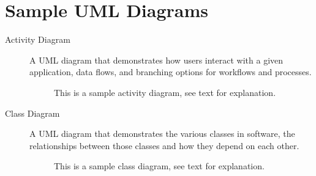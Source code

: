 %
% 
\section{Sample UML Diagrams}
\begin{description}
\item[Activity Diagram]  A UML diagram that demonstrates how users
interact with a given application, data flows, and branching options
for workflows and processes.
\begin{figure}[h!]
\caption[Activity Diagram Example]{
This is a sample activity diagram, see text for explanation.}
\end{figure}

\item[Class Diagram] A UML diagram that demonstrates the various classes
in software, the relationships between those classes and how they depend
on each other.
\begin{figure}[h!]
\caption[Class Diagram Example]{
This is a sample class diagram, see text for explanation.}
\end{figure}


\end{description}
